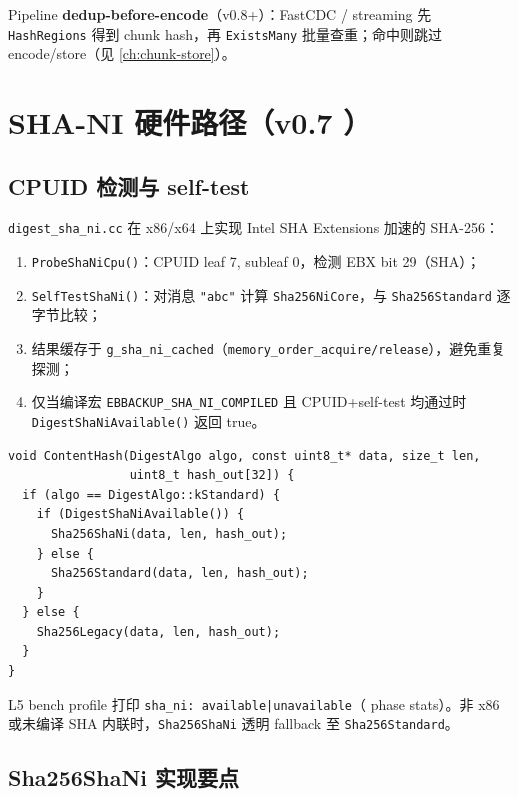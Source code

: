 Pipeline \textbf{dedup-before-encode}（v0.8+）：FastCDC / streaming 先 \texttt{HashRegions} 得到 chunk hash，再 \texttt{ExistsMany} 批量查重；命中则跳过 encode/store（见 \cref{ch:chunk-store}）。

\section{SHA-NI 硬件路径（v0.7 ）}

\subsection{CPUID 检测与 self-test}

\texttt{digest\_sha\_ni.cc} 在 x86/x64 上实现 Intel SHA Extensions 加速的 SHA-256：

\begin{enumerate}[nosep]
  \item \texttt{ProbeShaNiCpu()}：CPUID leaf 7, subleaf 0，检测 EBX bit 29（SHA）；
  \item \texttt{SelfTestShaNi()}：对消息 \texttt{"abc"} 计算 \texttt{Sha256NiCore}，与 \texttt{Sha256Standard} 逐字节比较；
  \item 结果缓存于 \texttt{g\_sha\_ni\_cached}（\texttt{memory\_order\_acquire/release}），避免重复探测；
  \item 仅当编译宏 \texttt{EBBACKUP\_SHA\_NI\_COMPILED} 且 CPUID+self-test 均通过时 \texttt{DigestShaNiAvailable()} 返回 true。
\end{enumerate}

\begin{lstlisting}[caption={ContentHash Standard 路径 dispatch},label={lst:content-hash-shani}]
void ContentHash(DigestAlgo algo, const uint8_t* data, size_t len,
                 uint8_t hash_out[32]) {
  if (algo == DigestAlgo::kStandard) {
    if (DigestShaNiAvailable()) {
      Sha256ShaNi(data, len, hash_out);
    } else {
      Sha256Standard(data, len, hash_out);
    }
  } else {
    Sha256Legacy(data, len, hash_out);
  }
}
\end{lstlisting}

L5 bench profile 打印 \texttt{sha\_ni: available|unavailable}（ phase stats）。非 x86 或未编译 SHA 内联时，\texttt{Sha256ShaNi} 透明 fallback 至 \texttt{Sha256Standard}。

\subsection{Sha256ShaNi 实现要点}

